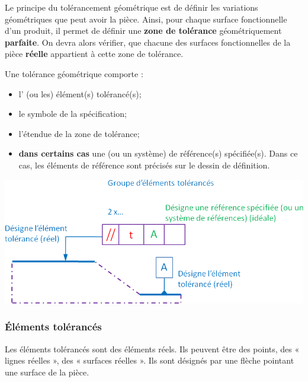 \documentclass[11pt,oneside]{article}
\begin{document}
Le principe du tolérancement géométrique est de définir les variations géométriques que peut avoir la pièce. Ainsi, pour chaque surface fonctionnelle d'un produit, il permet de définir une \textbf{zone de tolérance} géométriquement \textbf{parfaite}. On devra alors vérifier, que chacune des surfaces fonctionnelles de la pièce \textbf{réelle} appartient à cette zone de tolérance. 

\begin{defi}
\begin{minipage}[c]{.4\linewidth}
Une tolérance géométrique comporte :
\begin{itemize}
\item l' (ou les) élément(s) tolérancé(s);
\item le symbole de la spécification;
\item l'étendue de la zone de tolérance;
\item \textbf{dans certains cas} une (ou un système) de référence(s) spécifiée(s). Dans ce cas, les éléments de référence sont précisés sur le dessin de définition.
\end{itemize}
\end{minipage}
\begin{minipage}[c]{.55\linewidth}
\begin{center}
\includegraphics[width=.95\textwidth]{png/specification}
\end{center}
\end{minipage}
\end{defi}

\subsubsection{Éléments tolérancés}
\begin{defi}
Les éléments tolérancés sont des éléments réels. Ils peuvent être des points, des « lignes réelles », des « surfaces réelles ». 
Ils sont désignés par une flèche pointant une surface de la pièce.
\end{defi}
\end{document}
